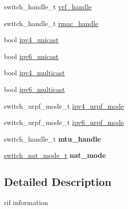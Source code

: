 \begin{DoxyCompactItemize}
\item 
switch\+\_\+handle\+\_\+t \hyperlink{structswitch__api__rif__info__s_a5a6e162884b7611e07c888702d1b4aee}{vrf\+\_\+handle}
\item 
switch\+\_\+handle\+\_\+t \hyperlink{structswitch__api__rif__info__s_a25e7088aadc374b61fa3e76b470fff54}{rmac\+\_\+handle}
\item 
bool \hyperlink{structswitch__api__rif__info__s_a75996488db66f18f7f48fdc1b3096230}{ipv4\+\_\+unicast}
\item 
bool \hyperlink{structswitch__api__rif__info__s_a23aa90832894a05c4ef776a33a0c3dc0}{ipv6\+\_\+unicast}
\item 
bool \hyperlink{structswitch__api__rif__info__s_aa0efa90de6c259b56c25f1af1955f30a}{ipv4\+\_\+multicast}
\item 
bool \hyperlink{structswitch__api__rif__info__s_ad00137adfd113d7e9e5f849430466809}{ipv6\+\_\+multicast}
\item 
switch\+\_\+urpf\+\_\+mode\+\_\+t \hyperlink{structswitch__api__rif__info__s_ab64a284f279f9350d360bd4e499c992a}{ipv4\+\_\+urpf\+\_\+mode}
\item 
switch\+\_\+urpf\+\_\+mode\+\_\+t \hyperlink{structswitch__api__rif__info__s_adc016d206c51c49ba0089401c4678727}{ipv6\+\_\+urpf\+\_\+mode}
\item 
\hypertarget{structswitch__api__rif__info__s_a45f6f532672ae9785b51cdff83288fc6}{switch\+\_\+handle\+\_\+t {\bfseries mtu\+\_\+handle}}\label{structswitch__api__rif__info__s_a45f6f532672ae9785b51cdff83288fc6}

\item 
\hypertarget{structswitch__api__rif__info__s_aef94830a3ed4261f1be4df2bbddb62a8}{\hyperlink{group__NAT_gaa9738ba923f6bdce6435354dd82f664a}{switch\+\_\+nat\+\_\+mode\+\_\+t} {\bfseries nat\+\_\+mode}}\label{structswitch__api__rif__info__s_aef94830a3ed4261f1be4df2bbddb62a8}

\end{DoxyCompactItemize}


\subsection{Detailed Description}
rif information 

